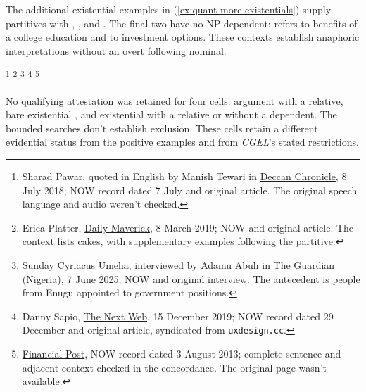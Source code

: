 \documentclass[12pt]{article}
\begin{document}
The additional existential examples in (\ref{ex:quant-more-existentials}) supply partitives with , , and . The final two have no NP dependent:  refers to benefits of a college education and  to investment options. These contexts establish anaphoric interpretations without an overt following nominal.

\ea\label{ex:quant-more-existentials}
\ea\label{ex:certain-exist-part} \footnote{Sharad Pawar, quoted in English by Manish Tewari in \href{https://www.deccanchronicle.com/opinion/columnists/080718/erdogans-victory-a-lesson-for-indian-oppn.html}{Deccan Chronicle}, 8 July 2018; NOW record dated 7 July and original article. The original speech language and audio weren't checked.}
\ex\label{ex:various-exist-part} \footnote{Erica Platter, \href{https://www.dailymaverick.co.za/article/2019-03-08-maros-weapons-of-diet-destruction/}{Daily Maverick}, 8 March 2019; NOW and original article. The context lists cakes, with supplementary examples following the partitive.}
\ex\label{ex:numerous-exist-part} \footnote{Sunday Cyriacus Umeha, interviewed by Adamu Abuh in \href{https://guardian.ng/politics/sunday-umeha-apc-government-is-showing-ndigbo-they-are-truly-part-and-parcel-of-nigeria/}{The Guardian (Nigeria)}, 7 June 2025; NOW and original interview. The antecedent is people from Enugu appointed to government positions.}
\ex\label{ex:numerous-exist-bare} \footnote{Danny Sapio, \href{https://thenextweb.com/news/you-probably-dont-need-a-degree-to-be-a-ui-ux-designer}{The Next Web}, 15 December 2019; NOW record dated 29 December and original article, syndicated from \nolinkurl{uxdesign.cc}.}
\ex\label{ex:countless-exist-bare} \footnote{\href{https://financialpost.com/personal-finance/young-money/youth-investing-personal-finance}{Financial Post}, NOW record dated 3 August 2013; complete sentence and adjacent context checked in the concordance. The original page wasn't available.}
\z\z

No qualifying attestation was retained for four cells: argument  with a relative, bare existential , and existential  with a relative or without a dependent. The bounded searches don't establish exclusion. These cells retain a different evidential status from the positive examples and from \textit{CGEL}'s stated restrictions.
\end{document}

